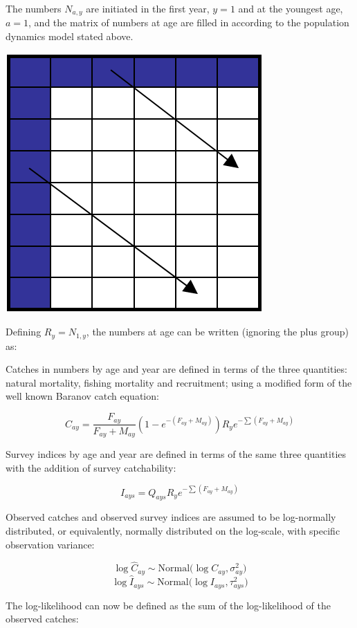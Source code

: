 \documentclass[
]{book}
\begin{document}
The numbers \(N_{a,y}\) are initiated in the first year, \(y=1\) and at the youngest age, \(a=1\), and the matrix of numbers at age are filled in according to the population dynamics model stated above.

\includegraphics{figure/sca_matrix.png}

Defining \(R_y = N_{1,y}\), the numbers at age can be written (ignoring the plus group) as:


Catches in numbers by age and year are defined in terms of the three quantities: natural mortality, fishing mortality and recruitment; using a modified form of the well known Baranov catch equation:

\[C_{ay} = \frac{F_{ay}}{F_{ay}+M_{ay}}\left(1 - e^{-(F_{ay}+M_{ay})}\right) R_{y}e^{-\sum (F_{ay} + M_{ay})} \]

Survey indices by age and year are defined in terms of the same three quantities with the addition of survey catchability:

\[I_{ays} = Q_{ays} R_{y}e^{-\sum (F_{ay} + M_{ay})}\]

Observed catches and observed survey indices are assumed to be log-normally distributed, or equivalently, normally distributed on the log-scale, with specific observation variance:

\[ \log \hat{C}_{ay} \sim \text{Normal} \Big( \log C_{ay}, \sigma^2_{ay}\Big) \]
\[ \log \hat{I}_{ays} \sim \text{Normal} \Big( \log I_{ays}, \tau^2_{ays} \Big) \]

The log-likelihood can now be defined as the sum of the log-likelihood of the observed catches:
\end{document}
